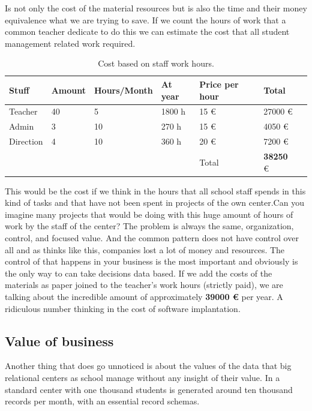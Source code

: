 Is not only the cost of the material resources but is also the time and their money
equivalence what we are trying to save.  If we count the hours of work that a
common teacher dedicate to do this we can estimate the cost that all student
management related work required.

\begin{table}[H]
\centering

\begin{tabular}{@{}lllllll@{}}

Stuff & Amount & Hours/Month & At year & Price per hour & Total  \\
\midrule

Teacher     & 40 & 5    & 1800 h   & 15 \euro  & 27000  \euro  \\
Admin       & 3  & 10   & 270 h   & 15 \euro  & 4050   \euro  \\
Direction   & 4  & 10   & 360 h   & 20 \euro  & 7200   \euro  \\

\midrule
& & & & Total & \textbf{38250} \euro \\
\end{tabular}
\caption{Cost based on staff work hours.}
\label{my-label}
\end{table}

\noindent This would be the cost if we think in the hours that all school staff spends
in this kind of tasks and that have not been spent in projects of the own
center.Can you imagine many projects that would be doing with this huge
amount of hours of work by the staff of the center?
\intro
The problem is always the same, organization, control, and focused value. And
the common pattern does not have control over all and as thinks like this,
companies lost a lot of money and resources. The control of that happens in your
business is the most important and obviously is the only way to can take
decisions data based.
\intro
If we add the costs of the materials as paper joined to the teacher's work hours
(strictly paid), we are talking about the incredible amount of approximately
\textbf{39000 \euro} per year. A ridiculous number thinking in the cost of
software implantation.

\subsection{Value of business}

Another thing that does go unnoticed is about the values of the data that big
relational centers as school manage without any insight of their value.
In a standard center with one thousand students is generated around ten thousand records per
month, with an essential record schemas.
\pagebreak

